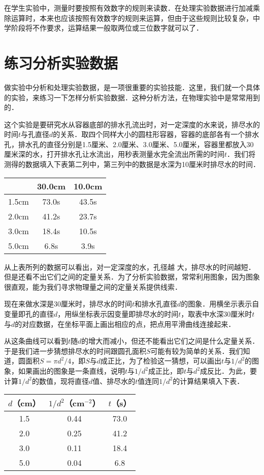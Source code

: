 在学生实验中，测量时要按照有效数字的规则来读数．在处理实验数据进行加减乘除运算时，本来也应该按照有效数字的规则来运算，但由于这些规则比较复杂，中学阶段将不作要求，运算结果一般取两位或三位数字就可以了．

\section{练习分析实验数据}
做实验中分析和处理实验数据，是一项很重要的实验技能．这里，我们就一个具体的实验，来练习一下怎样分析实验数据．这种分析方法，在物理实验中是常常用到的．

这个实验是要研究水从容器底部的排水孔流出时，对一定深度的水来说，排尽水的时间$t$与孔直径$d$的关系．取四个同样大小的圆柱形容器，容器的底部各有一个排水孔，排水孔的直径分别是1.5厘米、2.0厘米、3.0厘米、5.0厘米，容器里都放入30厘米深的水，打开排水孔让水流出，用秒表测量水完全流出所需的时间$t$．我们将测得的数据填入下表第二列中，第三列中的数据是水深为10厘米时排尽水的时间．

\begin{center}
    \begin{tabular}{ccc}
        \hline
&  30.0cm &  10.0cm\\
\hline
1.5cm &  73.0s & 43.5s \\
2.0cm &  41.2s & 23.7s \\
3.0cm &  18.4s & 10.5s \\
5.0cm &  6.8s &  3.9s\\
     \hline
    \end{tabular}
\end{center}

从上表所列的数据可以看出，对一定深度的水，孔径越
大，排尽水的时间越短．但是还看不出它们之间的定量关系．为了分析实验数据，常常利用图象，因为图象很直观，能为我们寻求物理量之间的定量关系提供线索．

现在来做水深是30厘米时，排尽水的时间$t$和排水孔直径$d$的图象．用横坐示表示自变量即孔的直径$d$，用纵坐标表示因变量即排尽水的时间$t$，取表中水深30厘米时$t$与$d$的对应数据，在坐标平面上画出相应的点，把点用平滑曲线连接起来．

从这条曲线可以看到$t$随$d$的增大而减小，但还不能看出它们之间是什么定量关系．于是我们进一步猜想排尽水的时间跟圆孔面积$S$可能有较为简单的关系．我们知道，圆面积$S=\pi d^2/4$，即$S$与$d$成正比，为了检验这一猜想，可以画出$t$与$1/d^2$的图象，如果画出的图象是一条直线，说明$t$与$1/d^2$成正比，即$t$与$d^2$成反比．为此，要计算$1/d^2$的数值，现将直径$d$值、排尽水的$t$值连同$1/d^2$的计算结果填入下表．

\begin{center}
    \begin{tabular}{ccc}
        \hline
$d$（cm）  &  $1/d^2$（cm$^{-2}$） &  $t$（s）\\
\hline
1.5 &  0.44 & 73.0 \\
2.0 &  0.25 & 41.2 \\
3.0 &  0.11 & 18.4 \\
5.0 &  0.04 & 6.8\\
     \hline
    \end{tabular}
\end{center}

